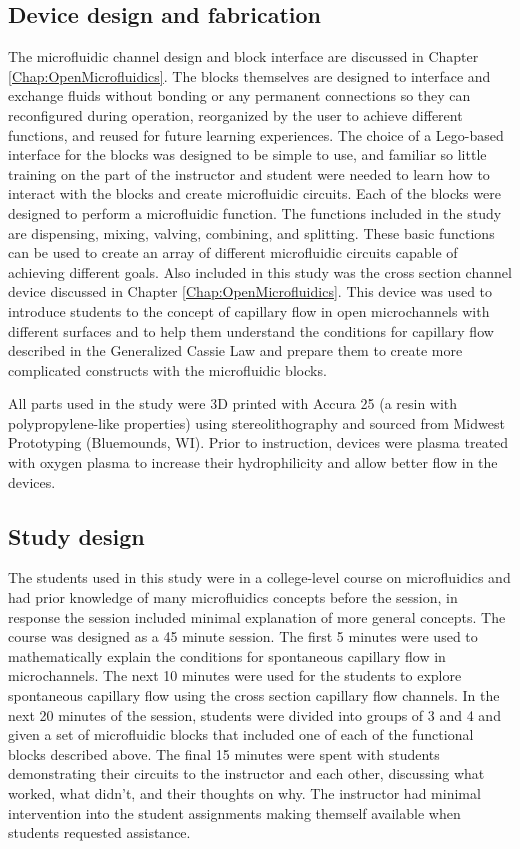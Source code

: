 \subsection{Device design and fabrication}
The microfluidic channel design and block interface are discussed in Chapter \ref{Chap:OpenMicrofluidics}. The blocks themselves are designed to interface and exchange fluids without bonding or any permanent connections so they can reconfigured during operation, reorganized by the user to achieve different functions, and reused for future learning experiences. The choice of a Lego-based interface for the  blocks was designed to be simple to use, and familiar so little training on the part of the instructor and student were needed to learn how to interact with the blocks and create microfluidic circuits. Each of the blocks were designed to perform a microfluidic function. The functions included in the study are dispensing, mixing, valving, combining, and splitting. These basic functions can be used to create an array of different microfluidic circuits capable of achieving different goals. 
Also included in this study was the cross section channel device discussed in Chapter \ref{Chap:OpenMicrofluidics}. This device was used to introduce students to the concept of capillary flow in open microchannels with different surfaces and to help them understand the conditions for capillary flow described in the Generalized Cassie Law \cite{Casavant2013, Berthier2015a} and prepare them to create more complicated constructs with the microfluidic blocks.

All parts used in the study were 3D printed with Accura 25 (a resin with polypropylene-like properties) using stereolithography and sourced from Midwest Prototyping (Bluemounds, WI). Prior to instruction, devices were plasma treated with oxygen plasma to increase their hydrophilicity and allow better flow in the devices.

\subsection{Study design}
The students used in this study were in a college-level course on microfluidics and had prior knowledge of many microfluidics concepts before the session, in response the session included minimal explanation of more general concepts. The course was designed as a 45 minute session. The first 5 minutes were used to mathematically explain the conditions for spontaneous capillary flow in microchannels. The next 10 minutes were used for the students to explore spontaneous capillary flow using the cross section capillary flow channels. In the next 20 minutes of the session, students were divided into groups of 3 and 4 and given a set of microfluidic blocks that included one of each of the functional blocks described above. The final 15 minutes were spent with students demonstrating their circuits to the instructor and each other, discussing what worked, what didn't, and their thoughts on why. The instructor had minimal intervention into the student assignments making themself available when students requested assistance. 

